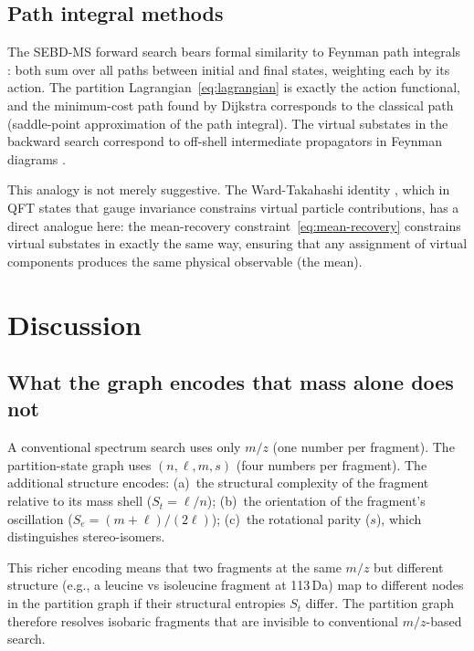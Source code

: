 \documentclass[twocolumn,10pt,a4paper]{article}
\theoremstyle{thmstyle}
\theoremstyle{definition}
\theoremstyle{remark}
\newcommand{\St}{S_{t}}
\newcommand{\Se}{S_{e}}
\begin{document}
\subsection{Path integral methods}

The SEBD-MS forward search bears formal similarity to Feynman path
integrals \citep{feynman1965}: both sum over all paths between
initial and final states, weighting each by its action. The partition
Lagrangian~\eqref{eq:lagrangian} is exactly the action functional,
and the minimum-cost path found by Dijkstra corresponds to the
classical path (saddle-point approximation of the path integral).
The virtual substates in the backward search correspond to off-shell
intermediate propagators in Feynman diagrams \citep{peskin1995}.

This analogy is not merely suggestive. The Ward-Takahashi
identity \citep{ward1950}, which in QFT states that gauge invariance
constrains virtual particle contributions, has a direct analogue here:
the mean-recovery constraint~\eqref{eq:mean-recovery} constrains
virtual substates in exactly the same way, ensuring that any
assignment of virtual components produces the same physical observable
(the mean).

\section{Discussion}
\label{sec:discussion}

\subsection{What the graph encodes that mass alone does not}

A conventional spectrum search uses only $m/z$ (one number per
fragment). The partition-state graph uses $(n, \ell, m, s)$ (four
numbers per fragment). The additional structure encodes:
(a)~the structural complexity of the fragment relative to its mass
shell ($\St = \ell/n$);
(b)~the orientation of the fragment's oscillation ($\Se = (m+\ell)/(2\ell)$);
(c)~the rotational parity ($s$), which distinguishes stereo-isomers.

This richer encoding means that two fragments at the same $m/z$ but
different structure (e.g., a leucine vs isoleucine fragment at
113\,Da) map to different nodes in the partition graph if their
structural entropies $\St$ differ. The partition graph therefore
resolves isobaric fragments that are invisible to conventional
$m/z$-based search.
\end{document}
